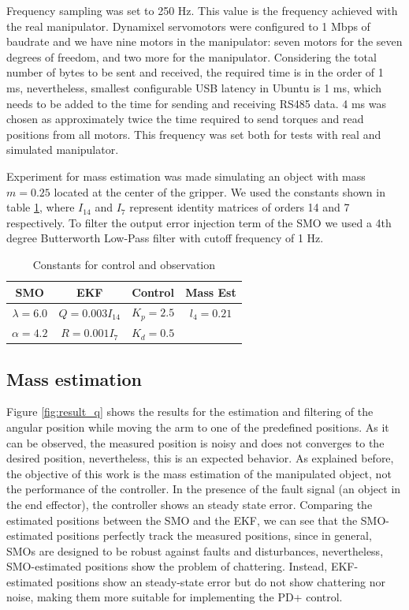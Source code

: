 \documentclass[a4paper, 10pt]{article}
\begin{document}
Frequency sampling was set to 250 Hz. This value is the frequency achieved with the real manipulator. Dynamixel servomotors were configured to 1 Mbps of baudrate and we have nine motors in the manipulator: seven motors for the seven degrees of freedom, and two more for the manipulator. Considering the total number of bytes to be sent and received, the required time is in the order of 1 ms, nevertheless, smallest configurable USB latency in Ubuntu is 1 ms, which needs to be added to the time for sending and receiving RS485 data. 4 ms was chosen as approximately twice the time required to send torques and read positions from all motors. This frequency was set both for tests with real and simulated manipulator. 

Experiment for mass estimation was made simulating an object with mass $m=0.25$ located at the center of the gripper. We used the constants shown in table \ref{tab:constants}, where $I_{14}$ and $I_7$ represent identity matrices of orders 14 and 7 respectively. To filter the output error injection term of the SMO we used a 4th degree Butterworth Low-Pass filter with cutoff frequency of 1 Hz. 
\begin{table}
  \centering
  \begin{tabular}{|c|c|c|c|}
    \hline
    SMO & EKF & Control & Mass Est\\
    \hline
    $\lambda=6.0$ & $Q = 0.003I_{14}$ & $K_p= 2.5$ & $l_4 = 0.21$\\
    $\alpha=4.2$ & $R = 0.001I_7$ & $K_d = 0.5$  & \\
    \hline
  \end{tabular}
  \caption{Constants for control and observation}
  \label{tab:constants}
\end{table}

\subsection{Mass estimation}
Figure \ref{fig:result_q} shows the results for the estimation and filtering of the angular position while moving the arm to one of the predefined positions. As it can be observed, the measured position is noisy and does not converges to the desired position, nevertheless, this is an expected behavior. As explained before, the objective of this work is the mass estimation of the manipulated object, not the performance of the controller. In the presence of the fault signal (an object in the end effector), the controller shows an steady state error. Comparing the estimated positions between the SMO and the EKF, we can see that the SMO-estimated positions perfectly track the measured positions, since in general, SMOs are designed to be robust against faults and disturbances, nevertheless, SMO-estimated positions show the problem of chattering. Instead, EKF-estimated positions show an steady-state error but do not show chattering nor noise, making them more suitable for implementing the PD+ control. 
\end{document}
